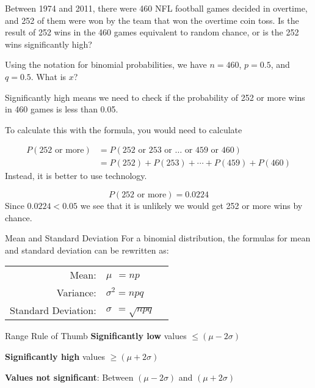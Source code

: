 \documentclass{beamer}
\newcommand{\prob}[1]{P\left(#1\right)}
\begin{document}
\begin{frame}
\begin{example}
Between 1974 and 2011, there were 460 NFL football games decided in overtime, and 252 of them were won by the team that won the overtime coin toss. Is the result of 252 wins in the 460 games equivalent to random chance, or is the 252 wins significantly high?\pause

\vspace{1mm}
Using the notation for binomial probabilities, we have $n=460$, $p=0.5$, and $q=0.5$. What is $x$?\pause

\vspace{1mm}
Significantly high means we need to check if the probability of 252 or more wins in 460 games is less than 0.05.\pause

\vspace{1mm}
To calculate this with the formula, you would need to calculate

\vspace{-3mm}
\begin{equation*}
\begin{aligned}
\prob{\text{252 or more}} &= \prob{\text{252 or 253 or $\ldots$ or 459 or 460}}\\
&= \prob{252}+\prob{253}+\cdots+\prob{459}+\prob{460}
\end{aligned}
\end{equation*}\pause
Instead, it is better to use technology.

\vspace{-3mm}
\begin{equation*}
\prob{252\text{ or more}}=0.0224
\end{equation*}\pause
Since $0.0224<0.05$ we see that it is unlikely we would get 252 or more wins by chance.
\end{example}
\end{frame}

\begin{frame}
\begin{block}{Mean and Standard Deviation}
For a binomial distribution, the formulas for mean and standard deviation can be rewritten as:
\begin{center}
\begin{tabular}{rll}
Mean: & $\mu^{\phantom{2}}=np$ \\
Variance: & $\sigma^2=npq$ \\
Standard Deviation: & $\sigma^{\phantom{2}}=\sqrt{npq}$
\end{tabular}
\end{center}
\end{block}\pause

\begin{block}{Range Rule of Thumb}
\textbf{Significantly low} values $\leq (\mu-2\sigma)$

\vspace{1mm}
\textbf{Significantly high} values $\geq (\mu+2\sigma)$

\vspace{1mm}
\textbf{Values not significant}: Between $(\mu-2\sigma)$ and $(\mu+2\sigma)$
\end{block}
\end{frame}
\end{document}
